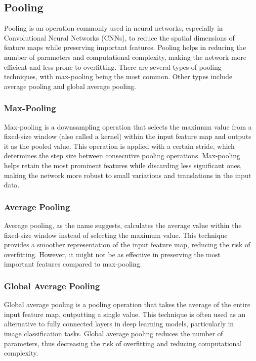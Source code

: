 \documentclass[12pt]{article}
\begin{document}
\subsection{Pooling}

Pooling is an operation commonly used in neural networks, especially in Convolutional Neural Networks (CNNs), to reduce the spatial dimensions of feature maps while preserving important features. Pooling helps in reducing the number of parameters and computational complexity, making the network more efficient and less prone to overfitting. There are several types of pooling techniques, with max-pooling being the most common. Other types include average pooling and global average pooling.

\subsubsection{Max-Pooling}

Max-pooling is a downsampling operation that selects the maximum value from a fixed-size window (also called a kernel) within the input feature map and outputs it as the pooled value. This operation is applied with a certain stride, which determines the step size between consecutive pooling operations. Max-pooling helps retain the most prominent features while discarding less significant ones, making the network more robust to small variations and translations in the input data.

\subsubsection{Average Pooling}

Average pooling, as the name suggests, calculates the average value within the fixed-size window instead of selecting the maximum value. This technique provides a smoother representation of the input feature map, reducing the risk of overfitting. However, it might not be as effective in preserving the most important features compared to max-pooling.

\subsubsection{Global Average Pooling}

Global average pooling is a pooling operation that takes the average of the entire input feature map, outputting a single value. This technique is often used as an alternative to fully connected layers in deep learning models, particularly in image classification tasks. Global average pooling reduces the number of parameters, thus decreasing the risk of overfitting and reducing computational complexity.
\end{document}
